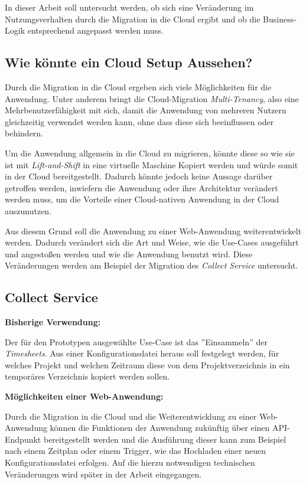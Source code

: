 In dieser Arbeit soll untersucht werden, ob sich eine Veränderung im Nutzungsverhalten durch die Migration in die Cloud ergibt und ob die Business-Logik entsprechend angepasst werden muss. \pagebreak

\subsection{Wie könnte ein Cloud Setup Aussehen?}
Durch die Migration in die Cloud ergeben sich viele Möglichkeiten für die Anwendung. Unter anderem bringt die Cloud-Migration \textit{\gls{Multi-Tenancy}}, also eine Mehrbenutzerfähigkeit mit sich, damit die Anwendung von mehreren Nutzern gleichzeitig verwendet werden kann, ohne dass diese sich beeinflussen oder behindern.

Um die Anwendung allgemein in die Cloud zu migrieren, könnte diese so wie sie ist mit \textit{Lift-and-Shift} in eine virtuelle Maschine Kopiert werden und würde somit in der Cloud bereitgestellt. Dadurch könnte jedoch keine Aussage darüber getroffen werden, inwiefern die Anwendung oder ihre Architektur verändert werden muss, um die Vorteile einer Cloud-nativen Anwendung in der Cloud auszunutzen.

Aus diesem Grund soll die Anwendung zu einer Web-Anwendung weiterentwickelt werden. Dadurch verändert sich die Art und Weise, wie die Use-Cases ausgeführt und angestoßen werden und wie die Anwendung benutzt wird. Diese Veränderungen werden am Beispiel der Migration des \textit{Collect Service} untersucht.

\subsection{Collect Service}
\textbf{Bisherige Verwendung:}

Der für den Prototypen ausgewählte Use-Case ist das ''Einsammeln'' der \textit{\glspl{Timesheet}}. Aus einer Konfigurationsdatei heraus soll festgelegt werden, für welches Projekt und welchen Zeitraum diese von dem Projektverzeichnis in ein temporäres Verzeichnis kopiert werden sollen. 

\textbf{Möglichkeiten einer Web-Anwendung:}

Durch die Migration in die Cloud und die Weiterentwicklung zu einer Web-Anwendung können die Funktionen der Anwendung zukünftig über einen API-Endpunkt bereitgestellt werden und die Ausführung dieser kann zum Beispiel nach einem Zeitplan oder einem Trigger, wie das Hochladen einer neuen Konfigurationsdatei erfolgen. Auf die hierzu notwendigen technischen Veränderungen wird später in der Arbeit eingegangen. \pagebreak

